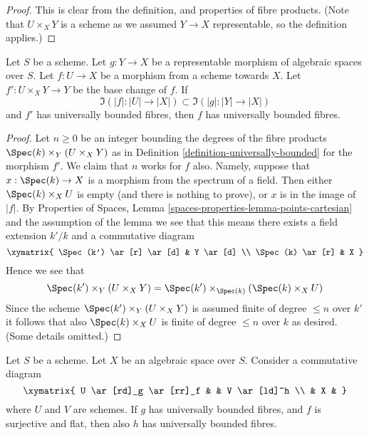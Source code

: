 \begin{proof}
This is clear from the definition, and properties of fibre products.
(Note that $U \times_X Y$ is a scheme
as we assumed $Y \to X$ representable, so the definition applies.)
\end{proof}

\begin{lemma}
\label{lemma-descent-universally-bounded}
Let $S$ be a scheme. Let $g : Y \to X$ be a representable morphism of
algebraic spaces over $S$. Let $f : U \to X$ be a morphism from a scheme
towards $X$. Let $f' : U \times_X Y \to Y$ be the base change of $f$.
If
$$
\Im(|f| : |U| \to |X|) \subset \Im(|g| : |Y| \to |X|)
$$
and $f'$ has universally bounded fibres, then $f$ has universally
bounded fibres.
\end{lemma}

\begin{proof}
Let $n \geq 0$ be an integer bounding the degrees of the fibre
products $\Spec(k) \times_Y (U \times_X Y)$ as in
Definition \ref{definition-universally-bounded} for the morphism $f'$.
We claim that $n$ works for $f$ also. Namely, suppose that
$x : \Spec(k) \to X$ is a morphism from the spectrum of
a field. Then either $\Spec(k) \times_X U$ is empty (and there
is nothing to prove), or $x$ is in the image of $|f|$. By
Properties of Spaces,
Lemma \ref{spaces-properties-lemma-points-cartesian}
and the assumption of the lemma we see
that this means there exists a field extension $k'/k$ and a
commutative diagram
$$
\xymatrix{
\Spec(k') \ar[r] \ar[d] & Y \ar[d] \\
\Spec(k) \ar[r] & X
}
$$
Hence we see that
$$
\Spec(k') \times_Y (U \times_X Y) =
\Spec(k') \times_{\Spec(k)} (\Spec(k) \times_X U)
$$
Since the scheme $\Spec(k') \times_Y (U \times_X Y)$ is assumed finite
of degree $\leq n$ over $k'$ it follows that also $\Spec(k) \times_X U$
is finite of degree $\leq n$ over $k$ as desired. (Some details omitted.)
\end{proof}

\begin{lemma}
\label{lemma-universally-bounded-permanence}
Let $S$ be a scheme. Let $X$ be an algebraic space over $S$.
Consider a commutative diagram
$$
\xymatrix{
U \ar[rd]_g \ar[rr]_f & & V \ar[ld]^h \\
& X &
}
$$
where $U$ and $V$ are schemes. If $g$ has universally bounded fibres,
and $f$ is surjective and flat, then also $h$ has universally bounded fibres.
\end{lemma}

